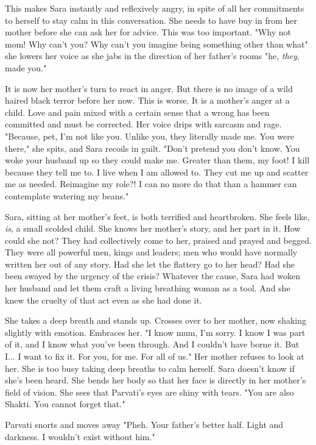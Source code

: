 \documentclass{article}
\begin{document}
This makes Sara instantly and reflexively angry, in spite of all her commitments to herself to stay calm in this conversation. She needs to have buy in from her mother before she can ask her for advice. This was too important. "Why not mom! Why can't you? Why can't you imagine being something other than what" she lowers her voice as she jabs in the direction of her father's rooms "he, \emph{they}, made you."

It is now her mother's turn to react in anger. But there is no image of a wild haired black terror before her now. This is worse. It is a mother's anger at a child. Love and pain mixed with a certain sense that a wrong has been committed and must be corrected. Her voice drips with sarcasm and rage. "Because, pet, I'm not like you. Unlike you, they literally made me. You were there," she spits, and Sara recoils in guilt. "Don't pretend you don't know. You woke your husband up so they could make me. Greater than them, my foot! I kill because they tell me to. I live when I am allowed to. They cut me up and scatter me as needed. Reimagine my role?! I can no more do that than a hammer can contemplate watering my beans."

Sara, sitting at her mother's feet, is both terrified and heartbroken. She feels like, \emph{is}, a small scolded child. She knows her mother's story, and her part in it. How could she not? They had collectively come to her, praised and prayed and begged. They were all powerful men, kings and leaders; men who would have normally written her out of any story. Had she let the flattery go to her head? Had she been swayed by the urgency of the crisis? Whatever the cause, Sara had woken her husband and let them craft a living breathing woman as a tool. And she knew the cruelty of that act even as she had done it.

She takes a deep breath and stands up. Crosses over to her mother, now shaking slightly with emotion. Embraces her. "I know mum, I'm sorry. I know I was part of it, and I know what you've been through. And I couldn't have borne it. But I... I want to fix it. For you, for me. For all of us." Her mother refuses to look at her. She is too busy taking deep breaths to calm herself. Sara doesn't know if she's been heard. She bends her body so that her face is directly in her mother's field of vision. She sees that Parvati's eyes are shiny with tears. "You are also Shakti. You cannot forget that."

Parvati snorts and moves away "Pheh. Your father's better half. Light and darkness. I wouldn't exist without him." 
\end{document}
